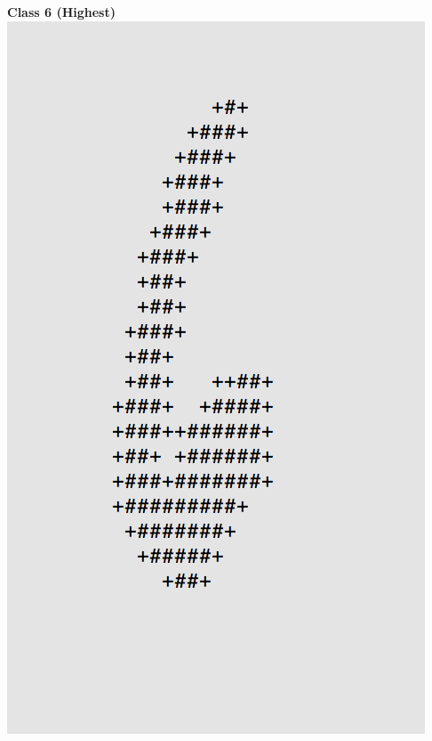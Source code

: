 \documentclass[11pt]{article}
\begin{document}
\begin{center}
\begin{multicols}{2}
\textbf{Class 6 (Highest)}\\
\includegraphics[scale=0.4]{part1/1/high_6.png}


\end{multicols}
\end{center}
\end{document}
